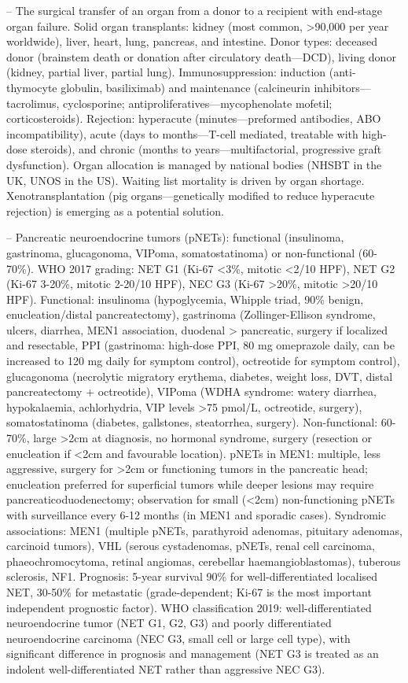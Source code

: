-- The surgical transfer of an organ from a donor to a recipient with end-stage organ failure. Solid organ transplants: kidney (most common, >90,000 per year worldwide), liver, heart, lung, pancreas, and intestine. Donor types: deceased donor (brainstem death or donation after circulatory death—DCD), living donor (kidney, partial liver, partial lung). Immunosuppression: induction (anti-thymocyte globulin, basiliximab) and maintenance (calcineurin inhibitors—tacrolimus, cyclosporine; antiproliferatives—mycophenolate mofetil; corticosteroids). Rejection: hyperacute (minutes—preformed antibodies, ABO incompatibility), acute (days to months—T-cell mediated, treatable with high-dose steroids), and chronic (months to years—multifactorial, progressive graft dysfunction). Organ allocation is managed by national bodies (NHSBT in the UK, UNOS in the US). Waiting list mortality is driven by organ shortage. Xenotransplantation (pig organs—genetically modified to reduce hyperacute rejection) is emerging as a potential solution.

-- Pancreatic neuroendocrine tumors (pNETs): functional (insulinoma, gastrinoma, glucagonoma, VIPoma, somatostatinoma) or non-functional (60-70\%). WHO 2017 grading: NET G1 (Ki-67 <3\%, mitotic <2/10 HPF), NET G2 (Ki-67 3-20\%, mitotic 2-20/10 HPF), NEC G3 (Ki-67 >20\%, mitotic >20/10 HPF). Functional: insulinoma (hypoglycemia, Whipple triad, 90\% benign, enucleation/distal pancreatectomy), gastrinoma (Zollinger-Ellison syndrome, ulcers, diarrhea, MEN1 association, duodenal > pancreatic, surgery if localized and resectable, PPI (gastrinoma: high-dose PPI, 80 mg omeprazole daily, can be increased to 120 mg daily for symptom control), octreotide for symptom control), glucagonoma (necrolytic migratory erythema, diabetes, weight loss, DVT, distal pancreatectomy + octreotide), VIPoma (WDHA syndrome: watery diarrhea, hypokalaemia, achlorhydria, VIP levels >75 pmol/L, octreotide, surgery), somatostatinoma (diabetes, gallstones, steatorrhea, surgery). Non-functional: 60-70\%, large >2cm at diagnosis, no hormonal syndrome, surgery (resection or enucleation if <2cm and favourable location). pNETs in MEN1: multiple, less aggressive, surgery for >2cm or functioning tumors in the pancreatic head; enucleation preferred for superficial tumors while deeper lesions may require pancreaticoduodenectomy; observation for small (<2cm) non-functioning pNETs with surveillance every 6-12 months (in MEN1 and sporadic cases). Syndromic associations: MEN1 (multiple pNETs, parathyroid adenomas, pituitary adenomas, carcinoid tumors), VHL (serous cystadenomas, pNETs, renal cell carcinoma, phaeochromocytoma, retinal angiomas, cerebellar haemangioblastomas), tuberous sclerosis, NF1. Prognosis: 5-year survival 90\% for well-differentiated localised NET, 30-50\% for metastatic (grade-dependent; Ki-67 is the most important independent prognostic factor). WHO classification 2019: well-differentiated neuroendocrine tumor (NET G1, G2, G3) and poorly differentiated neuroendocrine carcinoma (NEC G3, small cell or large cell type), with significant difference in prognosis and management (NET G3 is treated as an indolent well-differentiated NET rather than aggressive NEC G3).

